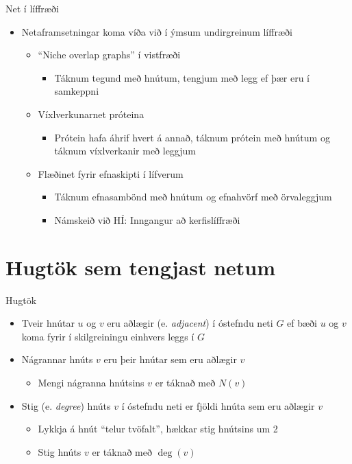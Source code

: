 \documentclass{beamer}
\begin{document}
\begin{frame}{Net í líffræði}
\begin{itemize}
 \item Netaframsetningar koma víða við í ýmsum undirgreinum líffræði
 \begin{itemize}
  \item ``Niche overlap graphs'' í vistfræði
  \begin{itemize}
   \item Táknum tegund með hnútum, tengjum með legg ef þær eru í samkeppni
  \end{itemize}
  \item Víxlverkunarnet próteina
  \begin{itemize}
   \item Prótein hafa áhrif hvert á annað, táknum prótein með hnútum og táknum víxlverkanir með leggjum
  \end{itemize}
  \item Flæðinet fyrir efnaskipti í lífverum
  \begin{itemize}
   \item Táknum efnasambönd með hnútum og efnahvörf með örvaleggjum
   \item Námskeið við HÍ: Inngangur að kerfislíffræði
  \end{itemize}
 \end{itemize}
\end{itemize}
\end{frame}

\section{Hugtök sem tengjast netum}

\begin{frame}{Hugtök}
\begin{itemize}
 \item Tveir hnútar $u$ og $v$ eru aðlægir (e. \emph{adjacent}) í óstefndu neti $G$ ef bæði $u$ og $v$ koma fyrir í skilgreiningu einhvers leggs í $G$
 \item Nágrannar hnúts $v$ eru þeir hnútar sem eru aðlægir $v$
 \begin{itemize}
  \item Mengi nágranna hnútsins $v$ er táknað með $N(v)$
 \end{itemize}
 \item Stig (e. \emph{degree}) hnúts $v$ í óstefndu neti er fjöldi hnúta sem eru aðlægir $v$
 \begin{itemize}
  \item Lykkja á hnút ``telur tvöfalt'', hækkar stig hnútsins um 2
  \item Stig hnúts $v$ er táknað með $\deg(v)$
 \end{itemize}
\end{itemize}
\end{frame}
\end{document}
